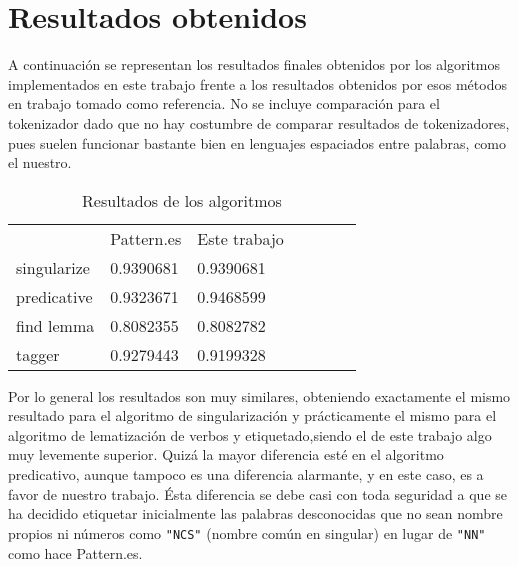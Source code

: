 \section{Resultados obtenidos}
A continuación se representan los resultados finales obtenidos por los algoritmos implementados en este trabajo frente a los resultados obtenidos por esos métodos en trabajo tomado como referencia. No se incluye comparación para el tokenizador dado que no hay costumbre de comparar resultados de tokenizadores, pues suelen funcionar bastante bien en lenguajes espaciados entre palabras, como el nuestro. 
\begin{table}[H]
\centering
\caption*{Resultados de los algoritmos}
\label{my-label}
\begin{tabular}{l|l|l|llll}
\cline{2-3}
                       &    \textsf{Pattern.es}               &   \textsf{Este trabajo}                &  \\ \cline{1-3}
\multicolumn{1}{|l|}{singularize} & 0.9390681  & 0.9390681     &   \\ \cline{1-1}
\multicolumn{1}{|l|}{predicative} & 0.9323671  & 0.9468599     &    \\ \cline{1-1}
\multicolumn{1}{|l|}{find lemma}  & 0.8082355  & 0.8082782     &   \\ \cline{1-1}
\multicolumn{1}{|l|}{tagger}      & 0.9279443  & 0.9199328    &   \\ \cline{1-3}
\end{tabular}
\end{table}

Por lo general los resultados son muy similares, obteniendo exactamente el mismo resultado para el algoritmo de singularización y prácticamente el mismo para el algoritmo de lematización de verbos y etiquetado,siendo el de este trabajo algo muy levemente superior. \newline
Quizá la mayor diferencia esté en el algoritmo predicativo, aunque tampoco es una diferencia alarmante, y en este caso, es a favor de nuestro trabajo. Ésta diferencia se debe casi con toda seguridad a que se ha decidido etiquetar inicialmente las palabras desconocidas que no sean nombre propios ni números como \texttt{"NCS"} (nombre común en singular) en lugar de \texttt{"NN"} como hace \textsf{Pattern.es}.     